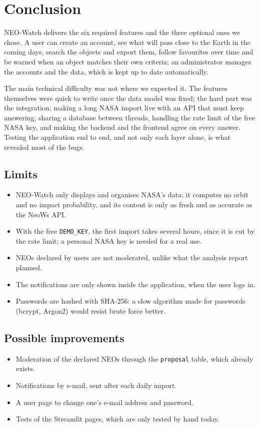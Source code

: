 \section{Conclusion}

NEO-Watch delivers the six required features and the three optional ones we chose. A user can
create an account, see what will pass close to the Earth in the coming days, search the objects
and export them, follow favourites over time and be warned when an object matches their own
criteria; an administrator manages the accounts and the data, which is kept up to date
automatically.

\vspace{0.25cm}

The main technical difficulty was not where we expected it. The features themselves were quick
to write once the data model was fixed; the hard part was the integration: making a long NASA
import live with an API that must keep answering, sharing a database between threads, handling
the rate limit of the free NASA key, and making the backend and the frontend agree on every
answer. Testing the application end to end, and not only each layer alone, is what revealed most
of the bugs.

\subsection{Limits}

\begin{itemize}
  \item NEO-Watch only displays and organises NASA's data: it computes no orbit and no impact
  probability, and its content is only as fresh and as accurate as the NeoWs API.
  \item With the free \texttt{DEMO\_KEY}, the first import takes several hours, since it is cut
  by the rate limit; a personal NASA key is needed for a real use.
  \item NEOs declared by users are not moderated, unlike what the analysis report planned.
  \item The notifications are only shown inside the application, when the user logs in.
  \item Passwords are hashed with SHA-256: a slow algorithm made for passwords (bcrypt, Argon2)
  would resist brute force better.
\end{itemize}

\subsection{Possible improvements}

\begin{itemize}
  \item Moderation of the declared NEOs through the \texttt{proposal} table, which already exists.
  \item Notifications by e-mail, sent after each daily import.
  \item A user page to change one's e-mail address and password.
  \item Tests of the Streamlit pages, which are only tested by hand today.
\end{itemize}
